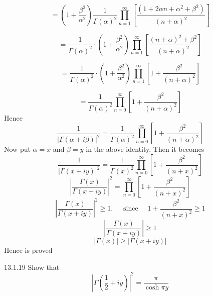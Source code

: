 \documentclass{article}
\begin{document}
\begin{flushleft}
$$
=\left(1+\frac{\beta^{2}}{\alpha^{2}}\right) \frac{1}{\Gamma(\alpha)^{2}} \prod_{n=1}^{\infty}\left[\frac{\left(1+2 \alpha n+\alpha^{2}+\beta^{2}\right)}{(n+\alpha)^{2}}\right]
$$

$$
=\frac{1}{\Gamma(\alpha)^{2}} \cdot\left(1+\frac{\beta^{2}}{\alpha^{2}}\right) \prod_{n=1}^{\infty}\left[\frac{(n+\alpha)^{2}+\beta^{2}}{(n+\alpha)^{2}}\right]
$$

$$
=\frac{1}{\Gamma(\alpha)^{2}} \cdot\left(1+\frac{\beta^{2}}{\alpha^{2}}\right) \prod_{n=1}^{\infty}\left[1+\frac{\beta^{2}}{(n+\alpha)^{2}}\right]
$$

$$
=\frac{1}{\Gamma(\alpha)^{2}} \prod_{n=0}^{\infty}\left[1+\frac{\beta^{2}}{(n+\alpha)^{2}}\right]
$$
Hence
$$
\frac{1}{|\Gamma(\alpha+i \beta)|^{2}}=\frac{1}{\Gamma(\alpha)^{2}} \prod_{n=0}^{\infty}\left[1+\frac{\beta^{2}}{(n+\alpha)^{2}}\right]
$$
Now put $\alpha=x$ and $\beta=y$ in the above identity. Then it becomes
$$
\frac{1}{|\Gamma(x+i y)|^{2}}=\frac{1}{\Gamma(x)^{2}} \prod_{n=0}^{\infty}\left[1+\frac{\beta^{2}}{(n+x)^{2}}\right]
$$
$$
\left|\frac{\Gamma(x)}{\Gamma(x+i y)}\right|^{2}=\prod_{n=0}^{\infty}\left[1+\frac{\beta^{2}}{(n+x)^{2}}\right]
$$
$$
\left|\frac{\Gamma(x)}{\Gamma(x+i y)}\right|^{2} \geq 1, \quad \text { since }\quad 1+\frac{\beta^{2}}{(n+x)^{2}} \geq 1
$$
$$\left|\frac{\Gamma(x)}{\Gamma(x+i y)}\right| \geq 1$$
$$|\Gamma(x)| \geq|\Gamma(x+i y)|$$
Hence is proved






\newpage

\begin{mybox}{13.1.19}
Show that 
$$\left|\Gamma(\frac{1}{2}+i y)\right|^{2}=\frac{\pi}{\cosh \pi y}$$
\end{mybox}



\end{flushleft}
\end{document}
